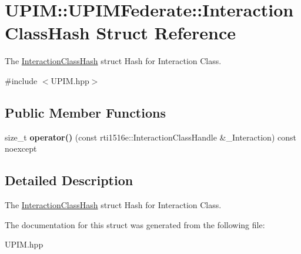 \hypertarget{structUPIM_1_1UPIMFederate_1_1InteractionClassHash}{}\section{U\+P\+IM\+:\+:U\+P\+I\+M\+Federate\+:\+:Interaction\+Class\+Hash Struct Reference}
\label{structUPIM_1_1UPIMFederate_1_1InteractionClassHash}


The \hyperlink{structUPIM_1_1UPIMFederate_1_1InteractionClassHash}{Interaction\+Class\+Hash} struct Hash for Interaction Class.  




{\ttfamily \#include $<$U\+P\+I\+M.\+hpp$>$}

\subsection*{Public Member Functions}
\begin{DoxyCompactItemize}
\item 
\mbox{\label{structUPIM_1_1UPIMFederate_1_1InteractionClassHash_acd97df84e3be954aafaf6c74b8d33734}} 
size\+\_\+t {\bfseries operator()} (const rti1516e\+::\+Interaction\+Class\+Handle \&\+\_\+\+Interaction) const noexcept
\end{DoxyCompactItemize}


\subsection{Detailed Description}
The \hyperlink{structUPIM_1_1UPIMFederate_1_1InteractionClassHash}{Interaction\+Class\+Hash} struct Hash for Interaction Class. 

The documentation for this struct was generated from the following file\+:\begin{DoxyCompactItemize}
\item 
U\+P\+I\+M.\+hpp\end{DoxyCompactItemize}
